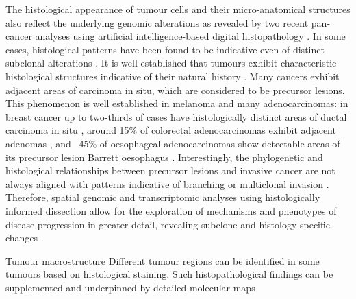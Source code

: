 The histological appearance of tumour cells and their micro-anatomical structures also reflect the underlying genomic alterations as revealed by two recent pan-cancer analyses using artificial intelligence-based digital histopathology \parencite{Kather2020-bt,Fu2020-cp}. In some cases, histological patterns have been found to be indicative even of distinct subclonal alterations \parencite{Lomakin2022-ks,Coudray2018-jm,Loeffler2022-xj}. It is well established that tumours exhibit characteristic histological structures indicative of their natural history . Many cancers exhibit adjacent areas of carcinoma in situ, which are considered to be precursor lesions. This phenomenon is well established in melanoma \parencite{Nirmal2022-sq} and many adenocarcinomas: in breast cancer up to two-thirds of cases have histologically distinct areas of ductal carcinoma in situ \parencite{Kole2019-hl}, around 15\% of colorectal adenocarcinomas exhibit adjacent adenomas \parencite{Ponz_de_Leon1990-zy}, and ~45\% of oesophageal adenocarcinomas show detectable areas of its precursor lesion Barrett oesophagus \parencite{Sawas2018-mt}. Interestingly, the phylogenetic and histological relationships between precursor lesions and invasive cancer are not always aligned with patterns indicative of branching \parencite{Ross-Innes2015-sq,Stachler2015-ca} or multiclonal invasion \parencite{Casasent2018-gx}. Therefore, spatial genomic and transcriptomic analyses using histologically informed dissection allow for the exploration of mechanisms and phenotypes of disease progression in greater detail, revealing subclone and histology-specific changes \parencite{Lomakin2022-ks}.

    {Tumour macrostructure \parencite{Seferbekova2023-wg}}
    {Different tumour regions can be identified in some tumours based on histological staining. Such histopathological findings can be supplemented and underpinned by detailed molecular maps}

